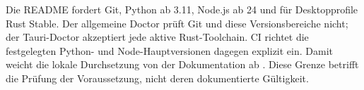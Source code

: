 Die README fordert Git, Python ab 3.11, Node.js ab 24 und für Desktopprofile
Rust Stable. Der allgemeine Doctor prüft Git und diese Versionsbereiche nicht;
der Tauri-Doctor akzeptiert jede aktive Rust-Toolchain. CI richtet die
festgelegten Python- und Node-Hauptversionen dagegen explizit ein. Damit weicht
die lokale Durchsetzung von der Dokumentation ab
\parencite{kleiveist2026governance-snapshot,kleiveist2026ci}.
Diese Grenze betrifft die Prüfung der Voraussetzung, nicht deren dokumentierte
Gültigkeit.
